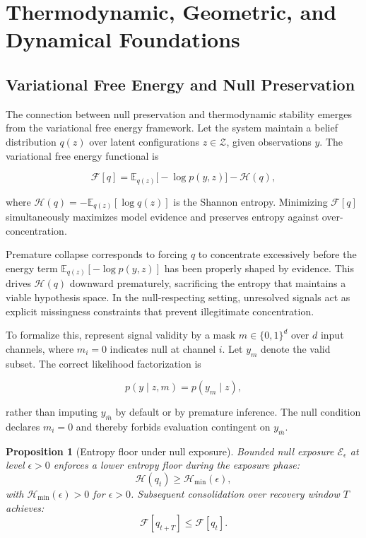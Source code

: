 \documentclass[11pt]{article}
\newtheorem{proposition}{Proposition}
\theoremstyle{remark}
\begin{document}

\section{Thermodynamic, Geometric, and Dynamical Foundations}
\label{sec:thermo}

\subsection{Variational Free Energy and Null Preservation}

The connection between null preservation and thermodynamic stability emerges from the variational free energy framework. Let the system maintain a belief distribution $q(z)$ over latent configurations $z \in \mathcal{Z}$, given observations $y$. The variational free energy functional is

\begin{equation}
\mathcal{F}[q] = \mathbb{E}_{q(z)}\bigl[-\log p(y,z)\bigr] - \mathcal{H}(q),
\label{eq:vfe}
\end{equation}

where $\mathcal{H}(q) = -\mathbb{E}_{q(z)}[\log q(z)]$ is the Shannon entropy. Minimizing $\mathcal{F}[q]$ simultaneously maximizes model evidence and preserves entropy against over-concentration.

Premature collapse corresponds to forcing $q$ to concentrate excessively before the energy term $\mathbb{E}_{q(z)}[-\log p(y,z)]$ has been properly shaped by evidence. This drives $\mathcal{H}(q)$ downward prematurely, sacrificing the entropy that maintains a viable hypothesis space. In the null-respecting setting, unresolved signals act as explicit missingness constraints that prevent illegitimate concentration.

To formalize this, represent signal validity by a mask $m \in \{0,1\}^d$ over $d$ input channels, where $m_i = 0$ indicates null at channel $i$. Let $y_m$ denote the valid subset. The correct likelihood factorization is

\[
p(y \mid z, m) = p(y_m \mid z),
\]

rather than imputing $y_{\bar{m}}$ by default or by premature inference. The null condition declares $m_i = 0$ and thereby forbids evaluation contingent on $y_{\bar{m}}$.

\begin{proposition}[Entropy floor under null exposure]
Bounded null exposure $\mathcal{E}_\epsilon$ at level $\epsilon > 0$ enforces a lower entropy floor during the exposure phase:
\[
\mathcal{H}(q_t) \geq \mathcal{H}_{\min}(\epsilon),
\]
with $\mathcal{H}_{\min}(\epsilon) > 0$ for $\epsilon > 0$. Subsequent consolidation over recovery window $T$ achieves:
\[
\mathcal{F}[q_{t+T}] \leq \mathcal{F}[q_t].
\]
\end{proposition}
\end{document}
